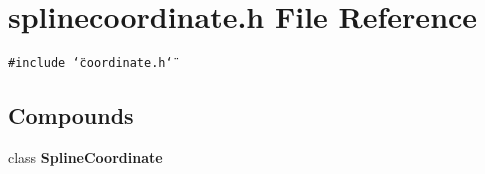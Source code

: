 \section{splinecoordinate.h File Reference}
\label{splinecoordinate_8h}
{\tt \#include \char`\"{}coordinate.h\char`\"{}}\par
\subsection*{Compounds}
\begin{CompactItemize}
\item 
class {\bf Spline\-Coordinate}
\end{CompactItemize}
